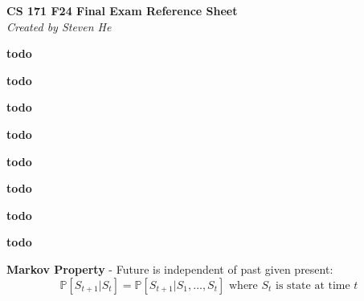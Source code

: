 \documentclass[a4paper,10pt]{article}
\begin{document}
\vspace{-1em}
\begin{center}
    \textbf{\footnotesize CS 171 F24 Final Exam Reference Sheet} \\[-0.5em]
    \textit{\scriptsize Created by Steven He}
\end{center}

\vspace{-1em}

\begin{multicols*}{2}

\begin{tcolorbox}[title=Uninformed Search, module]
    \textbf{todo}
\end{tcolorbox}

\begin{tcolorbox}[title=Heuristic Search, module]
    \textbf{todo}
\end{tcolorbox}

\begin{tcolorbox}[title=Game Search, module]
    \textbf{todo}
\end{tcolorbox}

\begin{tcolorbox}[title=Constraint Satisfaction, module]
    \textbf{todo}
\end{tcolorbox}

\begin{tcolorbox}[title=Logic, module]
    \textbf{todo}
\end{tcolorbox}

\begin{tcolorbox}[title={Probability \& Uncertainty, Bayesian Networks}, module]
    \textbf{todo}
\end{tcolorbox}

\begin{tcolorbox}[title={Intro to ML, Linear Regression, kNN}, module]
    \textbf{todo}
\end{tcolorbox}

\begin{tcolorbox}[title={Decision Trees and Neural Networks}, module]
    \textbf{todo}
\end{tcolorbox}

\begin{tcolorbox}[title={Reinforcement Learning}, module]
    \textbf{Markov Property} - Future is independent of past given present:
    \[
        \mathbb{P}[S_{t + 1} | S_t] = \mathbb{P}[S_{t + 1} | S_1, \ldots, S_t] \text{ where } S_t \text{ is state at time } t
    \]


\end{tcolorbox}
\end{multicols*}
\end{document}
